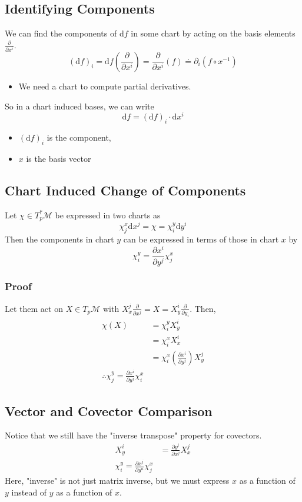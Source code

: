\documentclass[10pt]{article}
\begin{document}
\subsection*{Identifying Components}
We can find the components of $\text{d}f$ in some chart by acting on the basis elements $\frac{\partial}{\partial x^i}$.\\
\[(\text{d}f)_i = \text{d}f \left(\frac{\partial}{\partial x^i}\right) = \frac{\partial}{\partial x^i}(f) \doteq \partial_i (f \circ x^{-1})\]
\begin{itemize}
    \item We need a chart to compute partial derivatives.
\end{itemize}
So in a chart induced bases, we can write
\[\text{d}f = (\text{d}f)_i \cdot \text{d}x^i\]
\begin{itemize}
    \item $(\text{d}f)_i$ is the component,
    \item $x$ is the basis vector
\end{itemize}

\subsection*{Chart Induced Change of Components}
Let $\chi \in T_p^* \mathcal{M}$ be expressed in two charts as
\[\chi_j^x \text{d}x^j = \chi = \chi_i^y \text{d}y^i\]
Then the components in chart $y$ can be expressed in terms of those in chart $x$ by
\[\chi_i^y = \frac{\partial x^i}{\partial y^j} \chi_j^x\]

\subsubsection*{Proof}
Let them act on $X \in T_p \mathcal{M}$ with $X_x^j \frac{\partial}{\partial x^j} = X = X_y^i \frac{\partial}{\partial y_i}$.  Then,
\begin{align*}
    \chi(X) &= \chi_i^y X_y^i\\
    &= \chi_i^x X_x^i \\
    &= \chi_i^x \left(\frac{\partial x^i}{\partial y^j}\right) X_y^j\\
    \therefore \chi_j^y = \frac{\partial x^i}{\partial y^j} \chi_i^x
\end{align*}

\subsection*{Vector and Covector Comparison}
Notice that we still have the "inverse transpose" property for covectors.
\begin{align*}
    X_y^i &= \frac{\partial y^i}{\partial x^j} X_x^j\\
    \chi_i^y = \frac{\partial x^j}{\partial y^u} \chi_j^x
\end{align*}
Here, "inverse" is not just matrix inverse, but we must express $x$ as a function of $y$ instead of $y$ as a function of $x$.
\end{document}
